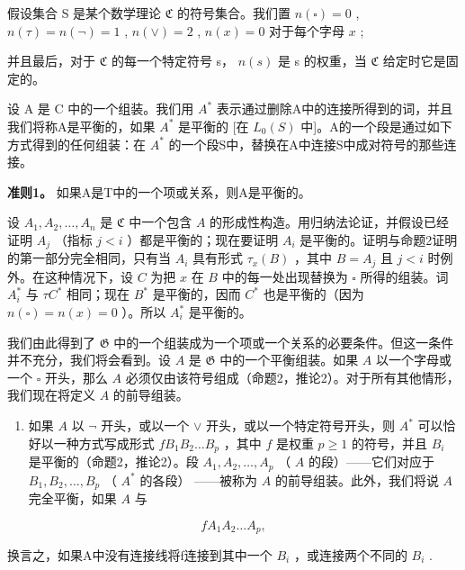 假设集合 S 是某个数学理论 \(\mathfrak{C}\) 的符号集合。我们置 \(n(\square) = 0\) , \(n(\tau) = n(\neg) = 1\) , \(n(\vee) = 2\) , \(n(x) = 0\) 对于每个字母 \(x\) ;

并且最后，对于 \(\mathfrak{C}\) 的每一个特定符号 s， \(n(s)\) 是 s 的权重，当 \(\mathfrak{C}\) 给定时它是固定的。

设 A 是 C 中的一个组装。我们用 \(A^{*}\) 表示通过删除A中的连接所得到的词，并且我们将称A是平衡的，如果 \(A^{*}\) 是平衡的 {[}在 \(L_{0}(S)\) 中{]}。A的一个段是通过如下方式得到的任何组装：在 \(A^{*}\) 的一个段S中，替换在A中连接S中成对符号的那些连接。

\textbf{准则1。} 如果A是T中的一个项或关系，则A是平衡的。

设 \(A_1, A_2, \ldots, A_n\) 是 \(\mathfrak{C}\) 中一个包含 \(A\) 的形成性构造。用归纳法论证，并假设已经证明 \(A_j\) （指标 \(j < i\) ）都是平衡的；现在要证明 \(A_i\) 是平衡的。证明与命题2证明的第一部分完全相同，只有当 \(A_i\) 具有形式 \(\tau_x(B)\) ，其中 \(B = A_j\) 且 \(j < i\) 时例外。在这种情况下，设 \(C\) 为把 \(x\) 在 \(B\) 中的每一处出现替换为 \(\square\) 所得的组装。词 \(A_i^*\) 与 \(\tau C^*\) 相同；现在 \(B^*\) 是平衡的，因而 \(C^*\) 也是平衡的（因为 \(n(\square) = n(x) = 0\) ）。所以 \(A_i^*\) 是平衡的。

我们由此得到了 \(\mathfrak{G}\) 中的一个组装成为一个项或一个关系的必要条件。但这一条件并不充分，我们将会看到。设 \(A\) 是 \(\mathfrak{G}\) 中的一个平衡组装。如果 \(A\) 以一个字母或一个 \(\square\) 开头，那么 \(A\) 必须仅由该符号组成（命题2，推论2）。对于所有其他情形，我们现在将定义 \(A\) 的前导组装。

\begin{enumerate}
\def\labelenumi{(\arabic{enumi})}
\tightlist
\item
  如果 \(A\) 以 \(\lnot\) 开头，或以一个 \(\vee\) 开头，或以一个特定符号开头，则 \(A^*\) 可以恰好以一种方式写成形式 \(fB_1B_2\ldots B_p\) ，其中 \(f\) 是权重 \(p \geqslant 1\) 的符号，并且 \(B_i\) 是平衡的（命题2，推论2）。段 \(A_1, A_2, \ldots, A_p\) （ \(A\) 的段）——它们对应于 \(B_1, B_2, \ldots, B_p\) （ \(A^*\) 的各段） ——被称为 \(A\) 的前导组装。此外，我们将说 \(A\) 完全平衡，如果 \(A\) 与
\end{enumerate}

\[
f A _ {1} A _ {2} \dots A _ {p},
\]

换言之，如果A中没有连接线将f连接到其中一个 \(B_{i}\) ，或连接两个不同的 \(B_{i}\) .

